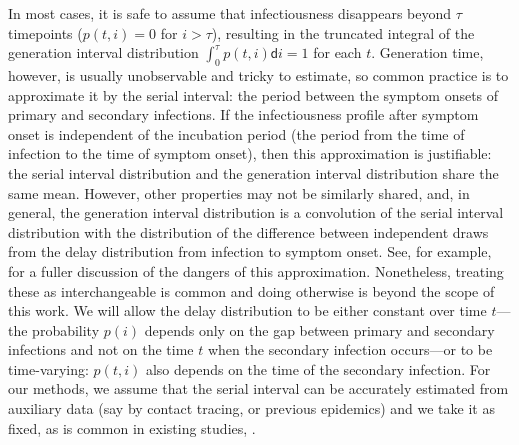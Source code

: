 \documentclass[10pt,letterpaper]{article}
\def\diff{\mathsf{d}}
\begin{document}
In most cases, it is safe to assume that infectiousness disappears beyond $\tau$
timepoints ($p(t,i) = 0$ for $i > \tau$), resulting in the truncated integral of
the generation interval distribution $\int_0^\tau p(t,i)\diff i = 1$ for each
$t$. Generation time, however, is usually unobservable and tricky to estimate,
so common practice is to approximate it by the serial interval: the period
between the symptom onsets of primary and secondary infections. If the
infectiousness profile after symptom onset is independent of the incubation
period (the period from the time of infection to the time of symptom onset),
then this approximation is justifiable: the serial interval distribution and the
generation interval distribution share the same mean. However, other properties
may not be similarly shared, and, in general, the generation interval
distribution is a convolution of the serial interval distribution with the
distribution of the difference between independent draws from the delay
distribution from infection to symptom onset. See, for example,
\cite{gostic2020practical} for a fuller discussion of the dangers of this
approximation. Nonetheless, treating these as interchangeable is common
\cite{cori2013new,park2021forward} and doing otherwise is beyond the scope of
this work. We will allow the delay distribution to be either constant over time
$t$---the probability $p(i)$ depends only on the gap between primary and
secondary infections and not on the time $t$ when the secondary infection
occurs---or to  be time-varying: $p(t,i)$ also depends on the time of the
secondary infection. For our methods, we assume that the serial interval can be
accurately estimated from auxiliary data (say by contact tracing, or previous
epidemics) and we take it as fixed, as is common in existing studies,
\cite{cori2013new,abry2020spatial,pascal2022nonsmooth}.
\end{document}
